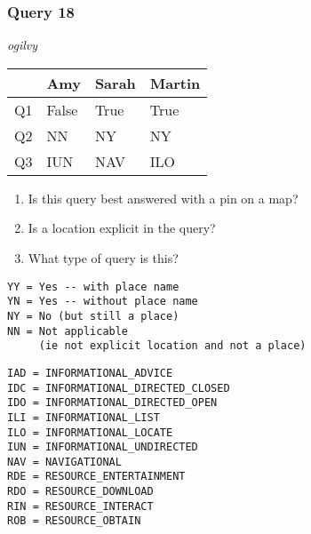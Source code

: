 \begin{frame}[fragile]
\frametitle{Query 18}
\vspace{1em}

\emph{ogilvy}

\vfill

\begin{table}
  \centering
  \begin{tabular}{ l l l l }
    & \textbf{Amy} & \textbf{Sarah} & \textbf{Martin}\\
    \toprule
    Q1 & False & True & True\\
Q2 & NN & NY & NY\\
Q3 & IUN & NAV & ILO\\
    \bottomrule
  \end{tabular}
\end{table}

\vfill

\tiny{

\begin{enumerate}
\item Is this query best answered with a pin on a map?
\item Is a location explicit in the query?
\item What type of query is this?
\end{enumerate}

\vfill

\begin{multicols}{2}
\begin{verbatim}
YY = Yes -- with place name
YN = Yes -- without place name
NY = No (but still a place)
NN = Not applicable 
     (ie not explicit location and not a place)
\end{verbatim}

\columnbreak
\begin{verbatim}
IAD = INFORMATIONAL_ADVICE
IDC = INFORMATIONAL_DIRECTED_CLOSED
IDO = INFORMATIONAL_DIRECTED_OPEN
ILI = INFORMATIONAL_LIST
ILO = INFORMATIONAL_LOCATE
IUN = INFORMATIONAL_UNDIRECTED
NAV = NAVIGATIONAL
RDE = RESOURCE_ENTERTAINMENT
RDO = RESOURCE_DOWNLOAD
RIN = RESOURCE_INTERACT
ROB = RESOURCE_OBTAIN
\end{verbatim}
\end{multicols}
}

\end{frame}


